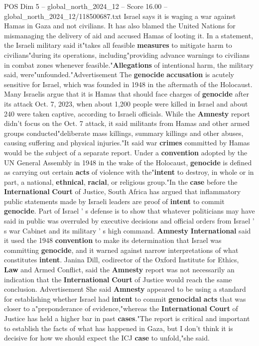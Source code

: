 \begin{textsample}{POS Dim 5 – global\_north\_2024\_12 – Score 16.00 – global\_north\_2024\_12/118500687.txt}
Israel says it is waging a war against Hamas in Gaza and not civilians.
It has also blamed the United Nations for mismanaging the delivery of aid and accused Hamas of looting it.
In a statement, the Israeli military said it"takes all feasible \textbf{measures} to mitigate harm to civilians"during its operations, including"providing advance warnings to civilians in combat zones whenever feasible."\textbf{Allegations} of intentional harm, the military said, were"unfounded."Advertisement The \textbf{genocide} \textbf{accusation} is acutely sensitive for Israel, which was founded in 1948 in the aftermath of the Holocaust.
Many Israelis argue that it is Hamas that should face charges of \textbf{genocide} after its attack Oct. 7, 2023, when about 1,200 people were killed in Israel and about 240 were taken captive, according to Israeli officials.
While the \textbf{Amnesty} report didn't focus on the Oct. 7 attack, it said militants from Hamas and other armed groups conducted"deliberate mass killings, summary killings and other abuses, causing suffering and physical injuries."It said war \textbf{crimes} committed by Hamas would be the subject of a separate report.
Under a \textbf{convention} adopted by the UN General Assembly in 1948 in the wake of the Holocaust, \textbf{genocide} is defined as carrying out certain \textbf{acts} of violence with the"\textbf{intent} to destroy, in whole or in part, a national, \textbf{ethnical}, \textbf{racial}, or religious group."In the \textbf{case} before the \textbf{International} \textbf{Court} of Justice, South Africa has argued that inflammatory public statements made by Israeli leaders are proof of \textbf{intent} to commit \textbf{genocide}.
Part of Israel ' s defense is to show that whatever politicians may have said in public was overruled by executive decisions and official orders from Israel ' s war Cabinet and its military ' s high command. \textbf{Amnesty} \textbf{International} said it used the 1948 \textbf{convention} to make its determination that Israel was committing \textbf{genocide}, and it warned against narrow interpretations of what constitutes \textbf{intent}.
Janina Dill, codirector of the Oxford Institute for Ethics, \textbf{Law} and Armed Conflict, said the \textbf{Amnesty} report was not necessarily an indication that the \textbf{International} \textbf{Court} of Justice would reach the same conclusion.
Advertisement She said \textbf{Amnesty} appeared to be using a standard for establishing whether Israel had \textbf{intent} to commit \textbf{genocidal} \textbf{acts} that was closer to a"preponderance of evidence,"whereas the \textbf{International} \textbf{Court} of Justice has held a higher bar in past \textbf{cases}."The report is critical and important to establish the facts of what has happened in Gaza, but I don't think it is decisive for how we should expect the ICJ \textbf{case} to unfold,"she said.

\end{textsample}
